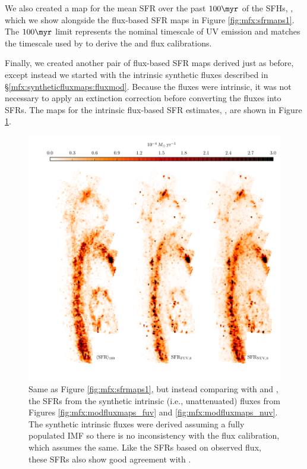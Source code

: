 We also created a map for the mean SFR over the past $100\myr$ of the SFHs,
\sfroneh{}, which we show alongside the flux-based SFR maps in Figure
\ref{fig:mfx:sfrmaps1}. The $100\myr$ limit represents the nominal timescale of
UV emission and matches the timescale used by \citet{Hao:2011} to derive the
\fuv{} and \nuv{} flux calibrations.

Finally, we created another pair of flux-based SFR maps derived just as before,
except instead we started with the intrinsic synthetic fluxes \fxsfhz{}
described in \S \ref{mfx:syntheticfluxmaps:fluxmod}. Because the fluxes were
intrinsic, it was not necessary to apply an extinction correction before
converting the fluxes into SFRs. The maps for the intrinsic flux-based SFR
estimates, \sfrxz{}, are shown in Figure \ref{fig:mfx:sfrmaps2}.


\begin{figure}
\centering
\includegraphics[width=\textwidth]{m31flux-figures/sfrmaps2.pdf}
\caption[SFR maps from estimates based on synthetic intrinsic fluxes compared
    with the mean SFR map from the SFHs.]{Same as Figure
    \ref{fig:mfx:sfrmaps1}, but instead comparing \sfroneh{} with \sfrfuvz{}
    and \sfrnuvz{}, the SFRs from the synthetic intrinsic (i.e., unattenuated)
    fluxes from Figures \ref{fig:mfx:modfluxmaps_fuv} and
    \ref{fig:mfx:modfluxmaps_nuv}. The synthetic intrinsic fluxes were derived
    assuming a fully populated IMF so there is no inconsistency with the flux
    calibration, which assumes the same. Like the SFRs based on observed flux,
    these SFRs also show good agreement with \sfroneh{}.
}
\label{fig:mfx:sfrmaps2}
\end{figure}





